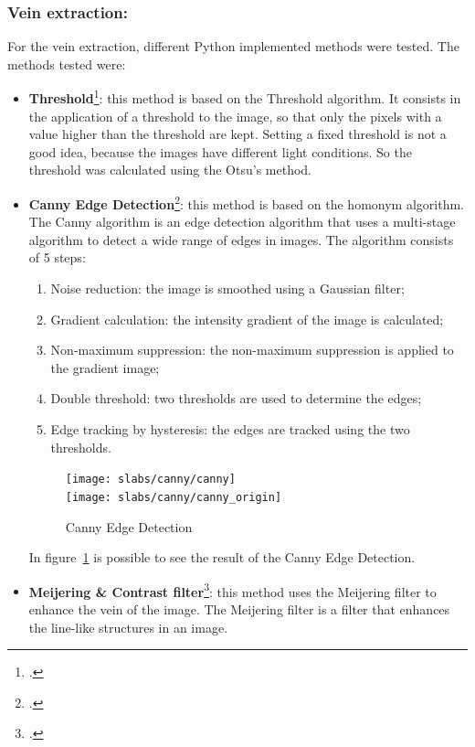 \subsubsection{Vein extraction:}
For the vein extraction, different Python implemented methods were tested.
The methods tested were:
\begin{itemize}
    \item \textbf{Threshold}\footcite{site:opencv-threshold}: this method is based on the Threshold algorithm.
    It consists in the application of a threshold to the image, so that only the pixels with a value higher than the threshold are kept.
    Setting a fixed threshold is not a good idea, because the images have different light conditions.
    So the threshold was calculated using the Otsu's method.
    \item \textbf{Canny Edge Detection}\footcite{site:opencv-canny}: this method is based on the homonym algorithm.
    The Canny algorithm is an edge detection algorithm that uses a multi-stage algorithm to detect a wide range of edges in images.
    The algorithm consists of 5 steps:
    \begin{enumerate}
        \item Noise reduction: the image is smoothed using a Gaussian filter;
        \item Gradient calculation: the intensity gradient of the image is calculated;
        \item Non-maximum suppression: the non-maximum suppression is applied to the gradient image;
        \item Double threshold: two thresholds are used to determine the edges;
        \item Edge tracking by hysteresis: the edges are tracked using the two thresholds.
    \end{enumerate}
    \begin{figure}[H]
        \centering
        \texttt{[image: slabs/canny/canny]}
        \\
        \texttt{[image: slabs/canny/canny\_origin]}
        \caption{Canny Edge Detection}\label{fig:canny_compare}
    \end{figure}
    In figure~\ref*{fig:canny_compare} is possible to see the result of the Canny Edge Detection.
    \item \textbf{Meijering \& Contrast filter}\footcite{site:sckit-meijering}: this method uses the Meijering filter to enhance the vein of the image.
    The Meijering filter is a filter that enhances the line-like structures in an image.

\end{itemize}
